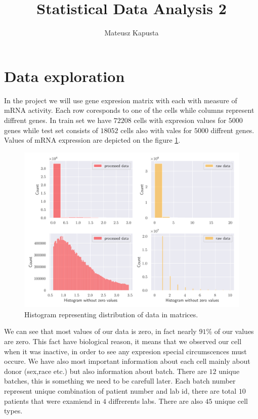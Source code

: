 \documentclass[12pt,a4paper]{article}
\title{\huge \bf \Title\\
    \large Statistical Data Analysis 2 
}
\author{Mateusz Kapusta}
\begin{document}
\maketitle
\section{Data exploration}
\hspace{1cm}In the project we will use gene expresion matrix with each with measure of mRNA activity. Each row coresponds to one of the cells while columns represent diffrent
genes. In train set we have $72208$ cells with expresion values for $5000$ genes while test set consists of $18052$ cells also with vales for $5000$ diffrent genes.
Values of mRNA expression are depicted on the figure \ref{histograms}. 
\begin{figure}[H]
    \centering
    \includegraphics[scale=0.7]{src/task1_histogram.png}
    \caption{Histogram representing distribution of data in matrices.}\label{histograms}
\end{figure}
We can see that most values of our data is zero, in fact nearly $91\%$ of our values are zero. 
This fact have biological reason, it means that we observed our cell when it was inactive, in order to
see any expresion special circumscences must occure. We have also most important information about each cell mainly about donor (sex,race etc.) but also information
about batch. There are $12$ unique batches, this is something we need to be carefull later. Each batch number represent unique combination of  patient number and lab id,
there are total $10$ patients that were examiend in $4$ diffrerents labs. There are also $45$ unique cell types.
\end{document}
